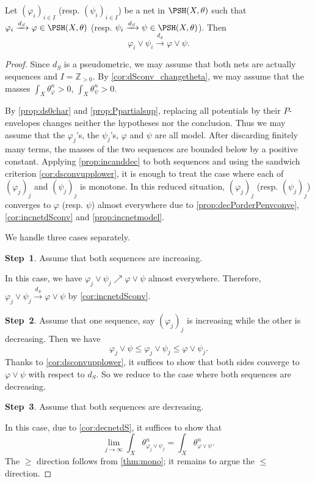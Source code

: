 \begin{proposition}\label{prop:lor_dS_conv}
    Let $(\varphi_i)_{i\in I}$ (resp. $(\psi_i)_{i\in I}$) be a net in $\PSH(X,\theta)$ such that $\varphi_i \xrightarrow{d_S}\varphi\in \PSH(X,\theta)$ (resp. $\psi_i \xrightarrow{d_S}\psi\in \PSH(X,\theta)$).
    Then
    \[
    \varphi_i\lor\psi_i\xrightarrow{d_S}\varphi\lor \psi.
    \]
\end{proposition}
\begin{proof}
    Since $d_S$ is a pseudometric, we may assume that both nets are actually sequences and $I=\mathbb{Z}_{>0}$. By \cref{cor:dSconv_changetheta}, we may assume that the masses $\int_X \theta_{\varphi}^n>0$, $\int_X \theta_{\psi}^n>0$.

    By \cref{prop:ds0char} and \cref{prop:Ppartialsup}, replacing all potentials by their $P$-envelopes changes neither the hypotheses nor the conclusion. Thus we may assume that the $\varphi_j$'s, the $\psi_j$'s, $\varphi$ and $\psi$ are all model. After discarding finitely many terms, the masses of the two sequences are bounded below by a positive constant. Applying \cref{prop:incanddec} to both sequences and using the sandwich criterion \cref{cor:dsconvupplower}, it is enough to treat the case where each of $(\varphi_j)_j$ and $(\psi_j)_j$ is monotone. In this reduced situation, $(\varphi_j)_j$ (resp. $(\psi_j)_j$) converges to $\varphi$ (resp. $\psi$) almost everywhere due to \cref{prop:decPorderPenvconve}, \cref{cor:incnetdSconv} and \cref{prop:incnetmodel}.

    We handle three cases separately.

\textbf{Step~1}. Assume that both sequences are increasing.

In this case, we have $\varphi_j\lor \psi_j\nearrow \varphi\lor \psi$ almost everywhere. Therefore, $\varphi_j\lor \psi_j\xrightarrow{d_S} \varphi\lor \psi$ by \cref{cor:incnetdSconv}.

\textbf{Step~2}. Assume that one sequence, say $(\varphi_j)_j$ is increasing while the other is decreasing. Then we have
\[
\varphi_j \lor \psi \leq \varphi_j \lor \psi_j \leq \varphi \lor \psi_j.
\]
Thanks to \cref{cor:dsconvupplower}, it suffices to show that both sides converge to $\varphi\lor \psi$ with respect to $d_S$. So we reduce to the case where both sequences are decreasing.

\textbf{Step~3}. Assume that both sequences are decreasing.

In this case, due to \cref{cor:decnetdS}, it suffices to show that
\begin{equation}\label{eq:masslortemp1}
\lim_{j\to\infty} \int_X \theta_{\varphi_j\lor \psi_j}^n=\int_X \theta_{\varphi\lor \psi}^n.
\end{equation}
The $\geq$ direction follows from \cref{thm:mono}; it remains to argue the $\leq$ direction.


\end{proof}
